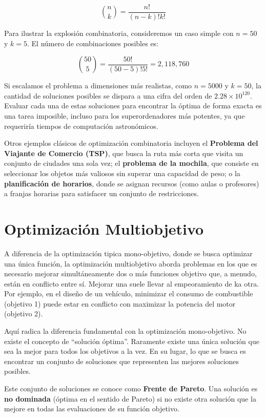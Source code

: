 \documentclass[12pt,a4paper]{book}
\begin{document}
$$
    \binom{n}{k} = \frac{n!}{(n-k)!k!}
$$

Para ilustrar la explosión combinatoria, consideremos un caso simple con $n=50$ y $k=5$. El número de combinaciones posibles es:

$$
    \binom{50}{5} = \frac{50!}{(50-5)!5!} = 2,118,760
$$

Si escalamos el problema a dimensiones más realistas, como $n=5000$ y $k=50$, la cantidad de soluciones posibles se dispara a una cifra del orden de $2.28 \times 10^{120}$. Evaluar cada una de estas soluciones para encontrar la óptima de forma exacta es una tarea imposible, incluso para los superordenadores más potentes, ya que requeriría tiempos de computación astronómicos.

Otros ejemplos clásicos de optimización combinatoria incluyen el \textbf{Problema del Viajante de Comercio (TSP)}, que busca la ruta más corta que visita un conjunto de ciudades una sola vez; el \textbf{problema de la mochila}, que consiste en seleccionar los objetos más valiosos sin superar una capacidad de peso; o la \textbf{planificación de horarios}, donde se asignan recursos (como aulas o profesores) a franjas horarias para satisfacer un conjunto de restricciones.

\section{Optimización Multiobjetivo}

A diferencia de la optimización tipica mono-objetivo, donde se busca optimizar una única función, la optimización multiobjetivo aborda problemas en los que es necesario mejorar simultáneamente dos o más funciones objetivo que, a menudo, están en conflicto entre sí. Mejorar una suele llevar al empeoramiento de ka otra. Por ejemplo, en el diseño de un vehículo, minimizar el consumo de combustible (objetivo 1) puede estar en conflicto con maximizar la potencia del motor (objetivo 2).

Aquí radica la diferencia fundamental con la optimización mono-objetivo. No existe el concepto de ``solución óptima''. Raramente existe una única solución que sea la mejor para todos los objetivos a la vez. En su lugar, lo que se busca es encontrar un conjunto de soluciones que representen las mejores soluciones posibles.

Este conjunto de soluciones se conoce como \textbf{Frente de Pareto}. Una solución es \textbf{no dominada} (óptima en el sentido de Pareto) si no existe otra solución que la mejore en todas las evaluaciones de su función objetivo.
\end{document}
